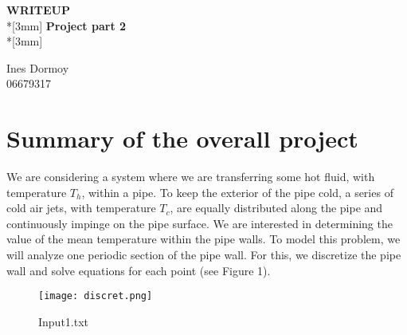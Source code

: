 \documentclass[12pt,a4paper]{article}
\begin{document}






\begin{center}
{\Large{\bf WRITEUP}}\\*[3mm]
{\bf Project part 2} \\*[3mm]

Ines Dormoy \\
06679317

\end{center}

\section{Summary of the overall project}

We are considering a system where we are transferring some hot fluid, with temperature $T_h $, within a pipe. To keep the exterior of the pipe cold, a series of cold air jets, with temperature $T_c$, are equally distributed along the pipe and continuously impinge on the pipe surface. We are interested in determining the value of the mean temperature within the pipe walls. To model this problem, we will analyze one periodic section of the pipe wall. For this, we discretize the pipe wall and solve equations for each point (see Figure 1). 

\begin{figure}[h!]
  \centerline{\texttt{[image: discret.png]}}
  \caption{Input1.txt}
  
\end{figure}
\end{document}
